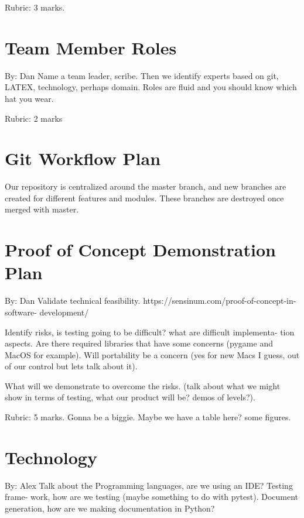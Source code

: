 \documentclass{article}
\begin{document}
Rubric:  3 marks.

\section{Team Member Roles}
By: Dan
Name  a  team  leader,  scribe.   Then  we  identify  experts  based  on  git,  
LATEX,
technology,  perhaps  domain.   Roles  are  fluid  and  you  should  know  
which  hat
you wear.

Rubric:  2 marks

\section{Git Workflow Plan}

Our repository is centralized around the master branch, and new branches are 
created for different features and modules. These branches are destroyed once merged with master. 

\section{Proof of Concept Demonstration Plan}
By: Dan
Validate technical feasibility.  
https://sensinum.com/proof-of-concept-in-software-
development/

Identify risks, is testing going to be difficult?  what are difficult 
implementa-
tion aspects.  Are there required libraries that have some concerns (pygame and
MacOS for example).  Will portability be a concern (yes for new Macs I guess,
out  of our control but lets talk about it).

What will we demonstrate to overcome the risks.  (talk about what we might
show in terms of testing, what our product will be?  demos of levels?).

Rubric:  5  marks.   Gonna  be  a  biggie.   Maybe  we  have  a  table  here?   
some figures.

\section{Technology}
By: Alex
Talk  about  the  Programming  languages,  are  we  using  an  IDE?  Testing  
frame-
work,  how  are  we  testing  (maybe  something  to  do  with  pytest).   
Document
generation, how are we making documentation in Python?
\end{document}
